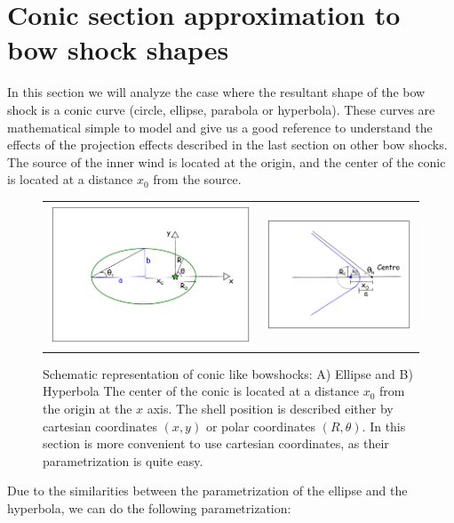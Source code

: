 \section{Conic section approximation to bow shock shapes}
\label{sec:conic}

\newcommand\Sin{\ensuremath{\mathcal{S}}}
\newcommand\Cos{\ensuremath{\mathcal{C}}}
\newcommand\Cot{\ensuremath{\mathcal{T}}}

In this section we will analyze the case where the resultant shape  of the bow shock is a conic curve (circle, ellipse, parabola or hyperbola).
These curves are mathematical simple to model and give us a good reference to understand the effects of the projection effects
described in the last section on other bow shocks. The source of the inner wind is located at the origin, and the center of the conic is located at
a distance $x_0$ from the source.

\begin{figure}
\begin{tabular}{cc}
\includegraphics[width=0.4\linewidth]{ellipse} &
\includegraphics[width=0.4\linewidth]{hiperbola}
\end{tabular}
\label{fig:conics}
\caption{Schematic representation of conic like bowshocks: A) Ellipse and B) Hyperbola The center of the conic is located at a distance $x_0$ from the origin at the $x$ axis. The shell position is 
described either by cartesian coordinates $(x,y)$ or polar coordinates $(R,\theta)$. In this section is more convenient to use cartesian coordinates, as their parametrization is quite easy.}
\end{figure}
Due to the similarities between the parametrization of the ellipse and the hyperbola, we can do the following parametrization:

